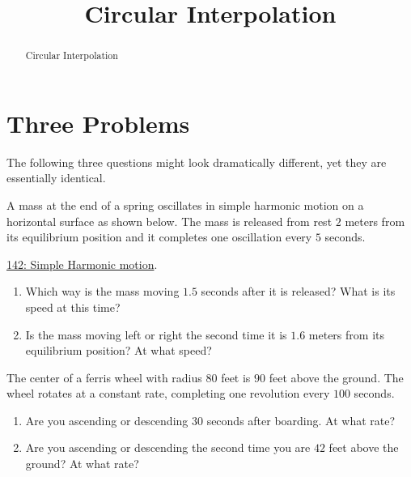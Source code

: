 \documentclass{ximera}
\title{Circular Interpolation}
\begin{document}
\begin{abstract}
Circular Interpolation
\end{abstract}
\maketitle

\section{Three Problems}

The following three questions might look dramatically different, yet they are essentially identical.


\begin{question}  \label{QLDFDferFD}
A mass at the end of a spring oscillates in simple harmonic motion on a horizontal surface as shown below. The mass is released from rest $2$ meters from its equilibrium position and it completes one oscillation every $5$ seconds.

\href{https://www.desmos.com/calculator/l0bp34oisg}{142: Simple Harmonic motion}.

 
\begin{onlineOnly}
    \begin{center}
\end{center}
\end{onlineOnly}


\begin{enumerate}
\item Which way is the mass moving $1.5$ seconds after it is released? What is its speed at this time?
\item Is the mass moving left or right the second time it is $1.6$ meters from its equilibrium position? At what speed?
\end{enumerate}

 
\end{question}

\begin{question}  \label{QLDKFrdsfR}
The center of a ferris wheel with radius $80$ feet is $90$ feet above the ground. The wheel rotates at a constant rate, completing one revolution every $100$ seconds.
\begin{enumerate}
\item Are you ascending or descending $30$ seconds after boarding. At what rate?
\item Are you ascending or descending the second time you are $42$ feet above the ground? At what rate?
\end{enumerate}
\end{question}
\end{document}
